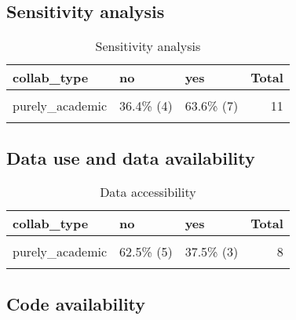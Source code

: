 \documentclass[
]{article}
\begin{document}
\hypertarget{sensitivity-analysis-1}{%
\subsection{Sensitivity analysis}\label{sensitivity-analysis-1}}

\begin{table}[H]

\caption{\label{tab:unnamed-chunk-59}Sensitivity analysis}
\centering
\begin{tabular}[t]{lllr}
\toprule
collab\_type & no & yes & Total\\
\midrule
\cellcolor{gray!6}{mixed} & \cellcolor{gray!6}{71.4\% (10)} & \cellcolor{gray!6}{28.6\%  (4)} & \cellcolor{gray!6}{14}\\
purely\_academic & 36.4\%  (4) & 63.6\%  (7) & 11\\
\cellcolor{gray!6}{Total} & \cellcolor{gray!6}{56.0\% (14)} & \cellcolor{gray!6}{44.0\% (11)} & \cellcolor{gray!6}{25}\\
\bottomrule
\end{tabular}
\end{table}

\hypertarget{data-use-and-data-availability-1}{%
\subsection{Data use and data
availability}\label{data-use-and-data-availability-1}}

\begin{table}[H]

\caption{\label{tab:unnamed-chunk-60}Data accessibility}
\centering
\begin{tabular}[t]{lllr}
\toprule
collab\_type & no & yes & Total\\
\midrule
\cellcolor{gray!6}{mixed} & \cellcolor{gray!6}{100.0\%  (6)} & \cellcolor{gray!6}{0.0\% (0)} & \cellcolor{gray!6}{6}\\
purely\_academic & 62.5\%  (5) & 37.5\% (3) & 8\\
\cellcolor{gray!6}{Total} & \cellcolor{gray!6}{78.6\% (11)} & \cellcolor{gray!6}{21.4\% (3)} & \cellcolor{gray!6}{14}\\
\bottomrule
\end{tabular}
\end{table}

\hypertarget{code-availability-1}{%
\subsection{Code availability}\label{code-availability-1}}
\end{document}
